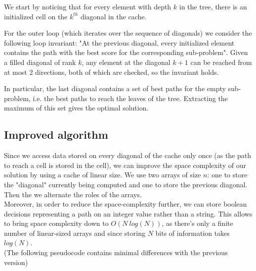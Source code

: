 \documentclass{article}
\begin{document}
We start by noticing that for every element with depth $k$ in the tree, there is an initialized cell on the $k^{th}$ diagonal in the cache.

For the outer loop (which iterates over the sequence of diagonals) we consider the following loop invariant: "At the previous diagonal, every initialized element contains the path with the best score for the corresponding sub-problem". Given a filled diagonal of rank $k$, any element at the diagonal $k+1$ can be reached from at most 2 directions, both of which are checked, so the invariant holds.

In particular, the last diagonal contains a set of best paths for the empty sub-problem, i.e. the best paths to reach the leaves of the tree. Extracting the maximum of this set gives the optimal solution.


\subsection{Improved algorithm}
Since we access data stored on every diagonal of the cache only once (as the path to reach a cell is stored in the cell), we can improve the space complexity of our solution by using a cache of linear size. We use two arrays of size $n$: one to store the "diagonal" currently being computed and one to store the previous diagonal. Then the we alternate the roles of the arrays.
\\
Moreover, in order to reduce the space-complexity further, we can store boolean decisions representing a path on an integer value rather than a string.
This allows to bring space complexity down to $O(N\ log(N))$, as there's only a finite number of linear-sized arrays and since storing $N$ bits of information takes $log(N)$.
\\
(The following pseudocode contains minimal differences with the previous version)
\end{document}
